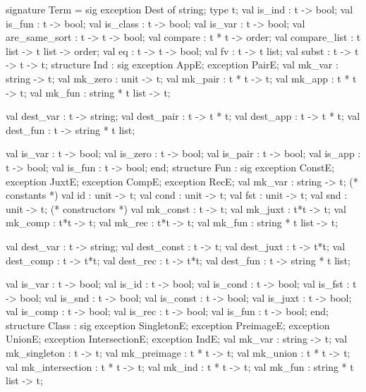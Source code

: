 \nwenddocs{}\endmoddef\nwstartdeflinemarkup\nwenddeflinemarkup
signature Term = sig
  exception Dest of string;
  type t;
  val is_ind : t -> bool;
  val is_fun : t -> bool;
  val is_class : t -> bool;
  val is_var : t -> bool;
  val are_same_sort : t -> t -> bool;
  val compare : t * t -> order;
  val compare_list : t list -> t list -> order;
  val eq : t -> t -> bool;
  val fv : t -> t list;
  val subst : t -> t -> t -> t;
  structure Ind : sig
              exception AppE;
              exception PairE;
              val mk_var : string -> t;
              val mk_zero : unit -> t;
              val mk_pair : t * t -> t;
              val mk_app : t * t -> t;
              val mk_fun : string * t list -> t;

              val dest_var : t -> string;
              val dest_pair : t -> t * t;
              val dest_app : t -> t * t;
              val dest_fun : t -> string * t list;

              val is_var : t -> bool;
              val is_zero : t -> bool;
              val is_pair : t -> bool;
              val is_app : t -> bool;
              val is_fun : t -> bool;
            end;
  structure Fun : sig
              exception ConstE;
              exception JuxtE;
              exception CompE;
              exception RecE;
              val mk_var : string -> t;
              (* constants *)
              val id : unit -> t;
              val cond : unit -> t;
              val fst : unit -> t;
              val snd : unit -> t;
              (* constructors *)
              val mk_const : t -> t;
              val mk_juxt : t*t -> t;
              val mk_comp : t*t -> t;
              val mk_rec : t*t -> t;
              val mk_fun : string * t list -> t;

              val dest_var : t -> string;
              val dest_const : t -> t;
              val dest_juxt : t -> t*t;
              val dest_comp : t -> t*t;
              val dest_rec : t -> t*t;
              val dest_fun : t -> string * t list;

              val is_var : t -> bool;
              val is_id : t -> bool;
              val is_cond : t -> bool;
              val is_fst : t -> bool;
              val is_snd : t -> bool;
              val is_const : t -> bool;
              val is_juxt : t -> bool;
              val is_comp : t -> bool;
              val is_rec : t -> bool;
              val is_fun : t -> bool;
            end;
  structure Class : sig
              exception SingletonE;
              exception PreimageE;
              exception UnionE;
              exception IntersectionE;
              exception IndE;
              val mk_var : string -> t;
              val mk_singleton : t -> t;
              val mk_preimage : t * t -> t;
              val mk_union : t * t -> t;
              val mk_intersection : t * t -> t;
              val mk_ind : t * t -> t;
              val mk_fun : string * t list -> t;
              
